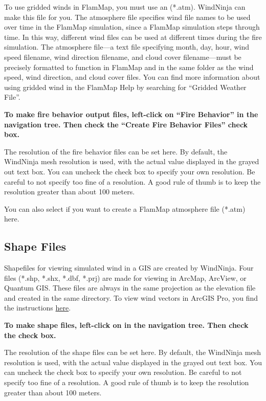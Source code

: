 \documentclass[12pt]{article}
\begin{document}
To use gridded winds in FlamMap, you must use an  (*.atm).  WindNinja can make this file for you.  
The atmosphere file specifies wind file names to be used over time in the FlamMap simulation, since a FlamMap simulation steps through time.  
In this way, different wind files can be used at different times during the fire simulation.  
The atmosphere file—a text file specifying month, day, hour, wind speed filename, wind direction filename, and cloud cover filename—must be precisely formatted to function in FlamMap and in the same folder as the wind speed, wind direction, and cloud cover files.  
You can find more information about using gridded wind in the FlamMap Help by searching for “Gridded Weather File”.

\textbf{\color{red} To make fire behavior output files, left-click on “Fire Behavior” in the navigation tree.  
Then check the “Create Fire Behavior Files” check box.}

The resolution of the fire behavior files can be set here.  
By default, the WindNinja mesh resolution is used, with the actual value displayed in the grayed out text box.  
You can uncheck the  check box to specify your own resolution.  Be careful to not specify too fine of a resolution.  
A good rule of thumb is to keep the resolution greater than about 100 meters.

You can also select if you want to create a FlamMap atmosphere file (*.atm) here.

\subsection{Shape Files}

Shapefiles for viewing simulated wind in a GIS are created by WindNinja.  
Four files (*.shp, *.shx, *.dbf, *.prj) are made for viewing in ArcMap, ArcView, or Quantum GIS.  
These files are always in the same projection as the elevation file and created in the same directory.  
To view wind vectors in ArcGIS Pro, you find the instructions \href{https://ninjastorm.firelab.org/windninja/tutorials/ArcGIS.pdf}{here}.

\textbf{\color{red} To make shape files, left-click on  in the navigation tree.  
Then check the  check box.}

The resolution of the shape files can be set here.  
By default, the WindNinja mesh resolution is used, with the actual value displayed in the grayed out text box.  
You can uncheck the  check box to specify your own resolution.  
Be careful to not specify too fine of a resolution.  
A good rule of thumb is to keep the resolution greater than about 100 meters.
\end{document}
